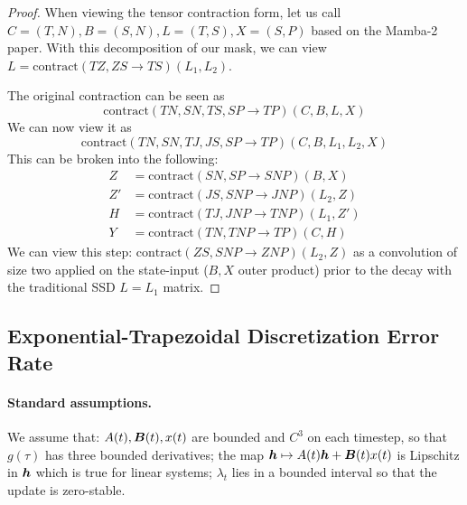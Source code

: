 \begin{proof}
    When viewing the tensor contraction form, let us call $C = (T,N), B=(S,N), L=(T,S), X=(S,P)$ based on the Mamba-2 paper. With this decomposition of our mask, we can view $L = \text{contract}(TZ,ZS\rightarrow TS)(L_1,L_2)$.
    
    The original contraction can be seen as
    $$\text{contract}(TN,SN,TS,SP\rightarrow TP)(C,B,L,X)$$
    We can now view it as
    $$\text{contract}(TN,SN,TJ,JS,SP\rightarrow TP)(C,B,L_1,L_2,X)$$
    This can be broken into the following:
    \begin{align*}
        Z &= \text{contract}(SN,SP\rightarrow SNP)(B,X)\\
        Z' &= \text{contract}(JS,SNP\rightarrow JNP)(L_2,Z)\\
        H &= \text{contract}(TJ,JNP\rightarrow TNP)(L_1,Z') \\
        Y &= \text{contract}(TN,TNP\rightarrow TP)(C,H)
    \end{align*}
    We can view this step: $\text{contract}(ZS,SNP\rightarrow ZNP)(L_2,Z)$ as a convolution of size two applied on the state-input ($B,X$ outer product) prior to the decay with the traditional SSD $L=L_1$ matrix.
\end{proof}
    
\subsection{Exponential-Trapezoidal Discretization Error Rate}
\label{app:trap-error-proof}
\paragraph{Standard assumptions.}
We assume that: $A(t),{\bm{B}}(t),x(t)$ are bounded and $C^3$ on each timestep, so that $g(\tau)$ has three bounded derivatives; the map ${\bm{h}} \mapsto A(t){\bm{h}} + {\bm{B}}(t)x(t)$ is Lipschitz in ${\bm{h}}$ which is true for linear systems; $\lambda_t$ lies in a bounded interval so that the update is zero-stable.

